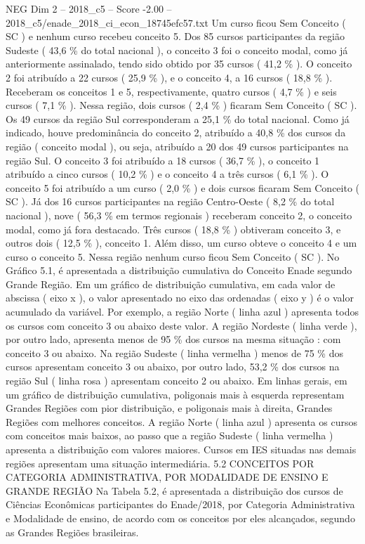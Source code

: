 \begin{textsample}{NEG Dim 2 – 2018\_c5 – Score -2.00 – 2018\_c5/enade\_2018\_ci\_econ\_18745efc57.txt}
Um curso ficou Sem Conceito ( SC ) e nenhum curso recebeu conceito 5.
Dos 85 cursos participantes da região Sudeste ( 43,6 \% do total nacional ), o conceito 3 foi o conceito modal, como já anteriormente assinalado, tendo sido obtido por 35 cursos ( 41,2 \% ).
O conceito 2 foi atribuído a 22 cursos ( 25,9 \% ), e o conceito 4, a 16 cursos ( 18,8 \% ).
Receberam os conceitos 1 e 5, respectivamente, quatro cursos ( 4,7 \% ) e seis cursos ( 7,1 \% ).
Nessa região, dois cursos ( 2,4 \% ) ficaram Sem Conceito ( SC ).
Os 49 cursos da região Sul corresponderam a 25,1 \% do total nacional.
Como já indicado, houve predominância do conceito 2, atribuído a 40,8 \% dos cursos da região ( conceito modal ), ou seja, atribuído a 20 dos 49 cursos participantes na região Sul.
O conceito 3 foi atribuído a 18 cursos ( 36,7 \% ), o conceito 1 atribuído a cinco cursos ( 10,2 \% ) e o conceito 4 a três cursos ( 6,1 \% ).
O conceito 5 foi atribuído a um curso ( 2,0 \% ) e dois cursos ficaram Sem Conceito ( SC ).
Já dos 16 cursos participantes na região Centro-Oeste ( 8,2 \% do total nacional ), nove ( 56,3 \% em termos regionais ) receberam conceito 2, o conceito modal, como já fora destacado.
Três cursos ( 18,8 \% ) obtiveram conceito 3, e outros dois ( 12,5 \% ), conceito 1.
Além disso, um curso obteve o conceito 4 e um curso o conceito 5.
Nessa região nenhum curso ficou Sem Conceito ( SC ).
No Gráfico 5.1, é apresentada a distribuição cumulativa do Conceito Enade segundo Grande Região.
Em um gráfico de distribuição cumulativa, em cada valor de abscissa ( eixo x ), o valor apresentado no eixo das ordenadas ( eixo y ) é o valor acumulado da variável.
Por exemplo, a região Norte ( linha azul ) apresenta todos os cursos com conceito 3 ou abaixo deste valor.
A região Nordeste ( linha verde ), por outro lado, apresenta menos de 95 \% dos cursos na mesma situação : com conceito 3 ou abaixo.
Na região Sudeste ( linha vermelha ) menos de 75 \% dos cursos apresentam conceito 3 ou abaixo, por outro lado, 53,2 \% dos cursos na região Sul ( linha rosa ) apresentam conceito 2 ou abaixo.
Em linhas gerais, em um gráfico de distribuição cumulativa, poligonais mais à esquerda representam Grandes Regiões com pior distribuição, e poligonais mais à direita, Grandes Regiões com melhores conceitos.
A região Norte ( linha azul ) apresenta os cursos com conceitos mais baixos, ao passo que a região Sudeste ( linha vermelha ) apresenta a distribuição com valores maiores.
Cursos em IES situadas nas demais regiões apresentam uma situação intermediária. 5.2 CONCEITOS POR CATEGORIA ADMINISTRATIVA, POR MODALIDADE DE ENSINO E GRANDE REGIÃO Na Tabela 5.2, é apresentada a distribuição dos cursos de Ciências Econômicas participantes do Enade/2018, por Categoria Administrativa e Modalidade de ensino, de acordo com os conceitos por eles alcançados, segundo as Grandes Regiões brasileiras.

\end{textsample}

